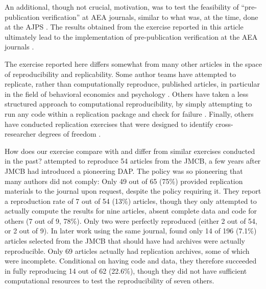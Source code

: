 An additional, though not crucial, motivation, was to test the feasibility of ``pre-publication verification'' at AEA journals, similar to what was, at the time, done at the \ac{AJPS} \parencite{JacobyShouldJournalsBe2017,Christian2018}. The results obtained from the exercise reported in this article ultimately lead to the implementation of pre-publication verification at the \ac{AEA} journals \parencite{10.1257/pandp.109.718,vilhuber2022a}.

The exercise reported here differs somewhat from many other articles in the space of reproducibility and replicability. Some author teams have attempted to replicate, rather than computationally reproduce, published articles, in particular in the field of behavioral economics and psychology \citep{opensciencecollaboration2015b,camerer2016,camerer2018}. Others have taken a less structured approach to computational reproducibility, by simply attempting to run any code within a replication package and check for failure \citep{trisovic2021,wang2020}. Finally, others have conducted replication exercises that were designed to identify cross-researcher degrees of freedom \citep{menkveld2023,huntington-klein2021}.



How does our exercise compare with and differ from similar exercises conducted in the past? 
\textcite{Dewald1986} attempted to reproduce 54 articles from the \ac{JMCB}, a few years after \ac{JMCB} had introduced a pioneering DAP. The policy was so pioneering that many authors did not comply: Only 49 out of 65 (75\%) provided replication materials to the journal upon request, despite the policy requiring it. They report a reproduction rate of  7 out of 54 (13\%) articles, though they only attempted to actually compute the results for nine articles, absent complete data and code for others (7 out of 9, 78\%). Only two were perfectly reproduced (either 2 out of 54, or 2 out of 9). In later work using the same journal, \textcite{McCullough2006} found only 14 of 196 (7.1\%) articles selected from the \ac{JMCB} that should have had archives were actually reproducible. Only 69 articles actually had replication archives, some of which were incomplete. Conditional on having code and data, they therefore succeeded in fully reproducing 14 out of 62 (22.6\%), though they did not have sufficient computational resources to test the reproducibility of seven others.

